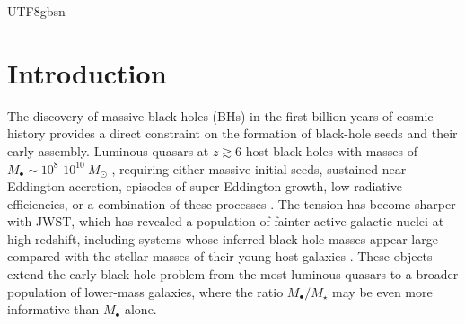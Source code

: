 \documentclass[trackchanges, twocolappendix, twocolumn]{aastex701}
\begin{document}
\begin{CJK*}{UTF8}{gbsn}


\section{Introduction} \label{sect:intro}

The discovery of massive black holes (BHs) in the first billion years of cosmic history provides a direct constraint on the formation of black-hole seeds and their early assembly. Luminous quasars at $z \gtrsim 6$ host black holes with masses of $M_{\bullet} \sim 10^8$-$10^{10}~M_\odot$ \citep[e.g.,][]{Banados+2018SMBH, Larson+2023SMBH, Kocevski+2023SMBH, Harikane+2023SMBH, Bogdan+2024SMBH, Furtak+2024SMBH}, requiring either massive initial seeds, sustained near-Eddington accretion, episodes of super-Eddington growth, low radiative efficiencies, or a combination of these processes \citep{Smith&Bromm+2019SMBH}. The tension has become sharper with JWST, which has revealed a population of fainter active galactic nuclei at high redshift, including systems whose inferred black-hole masses appear large compared with the stellar masses of their young host galaxies \citep[e.g.,][]{Maiolino+2024GN-z11&SMBH, Natarajan+2024UHZ1, Furtak+2024A2744QSO1}. These objects extend the early-black-hole problem from the most luminous quasars to a broader population of lower-mass galaxies, where the ratio $M_{\bullet} / M_\star$ may be even more informative than $M_{\bullet}$ alone.


\end{CJK*}
\end{document}
